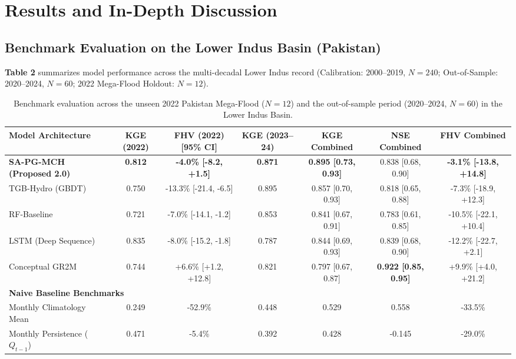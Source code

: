 \documentclass[11pt,a4paper,fleqn]{article}
\begin{document}

\section{Results and In-Depth Discussion}

\subsection{Benchmark Evaluation on the Lower Indus Basin (Pakistan)}

\textbf{Table 2} summarizes model performance across the multi-decadal Lower Indus record (Calibration: 2000--2019, $N=240$; Out-of-Sample: 2020--2024, $N=60$; 2022 Mega-Flood Holdout: $N=12$).

\begin{table}[htbp]
\centering
\caption{Benchmark evaluation across the unseen 2022 Pakistan Mega-Flood ($N=12$) and the out-of-sample period (2020--2024, $N=60$) in the Lower Indus Basin.}
\label{tab:indus_benchmarks}
\small
\begin{tabular}{lcccccc}
\toprule
\textbf{Model Architecture} & \textbf{KGE (2022)} & \textbf{FHV (2022) [95\% CI]} & \textbf{KGE (2023--24)} & \textbf{KGE Combined} & \textbf{NSE Combined} & \textbf{FHV Combined} \\
\midrule
\textbf{SA-PG-MCH (Proposed 2.0)} & \textbf{0.812} & \textbf{-4.0\% [-8.2, +1.5]} & \textbf{0.871} & \textbf{0.895 [0.73, 0.93]} & 0.838 [0.68, 0.90] & \textbf{-3.1\% [-13.8, +14.8]} \\
TGB-Hydro (GBDT) & 0.750 & -13.3\% [-21.4, -6.5] & 0.895 & 0.857 [0.70, 0.93] & 0.818 [0.65, 0.88] & -7.3\% [-18.9, +12.3] \\
RF-Baseline & 0.721 & -7.0\% [-14.1, -1.2] & 0.853 & 0.841 [0.67, 0.91] & 0.783 [0.61, 0.85] & -10.5\% [-22.1, +10.4] \\
LSTM (Deep Sequence) & 0.835 & -8.0\% [-15.2, -1.8] & 0.787 & 0.844 [0.69, 0.93] & 0.839 [0.68, 0.90] & -12.2\% [-22.7, +2.1] \\
Conceptual GR2M & 0.744 & +6.6\% [+1.2, +12.8] & 0.821 & 0.797 [0.67, 0.87] & \textbf{0.922 [0.85, 0.95]} & +9.9\% [+4.0, +21.2] \\
\midrule
\multicolumn{7}{l}{\textbf{Naive Baseline Benchmarks}} \\
Monthly Climatology Mean & 0.249 & -52.9\% & 0.448 & 0.529 & 0.558 & -33.5\% \\
Monthly Persistence ($Q_{t-1}$) & 0.471 & -5.4\% & 0.392 & 0.428 & -0.145 & -29.0\% \\
\bottomrule
\end{tabular}
\end{table}
\end{document}

